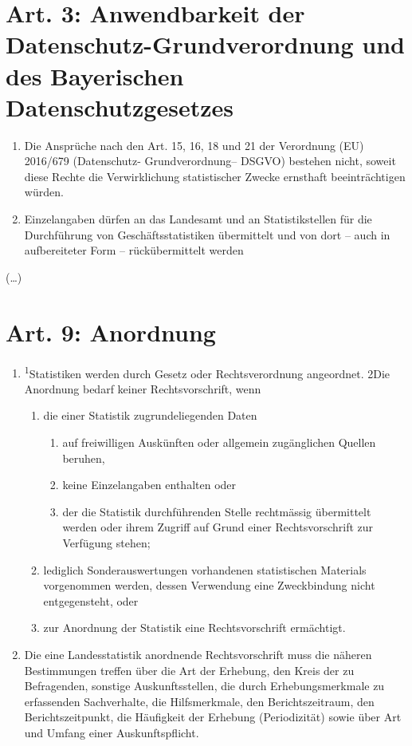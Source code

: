     \section[Art. 3: EU-DSGVO und BayDatSchG]{Art. 3: Anwendbarkeit der Datenschutz-Grundverordnung und des Bayerischen Datenschutzgesetzes}
        \begin{enumerate}[label=(\arabic*)]
            \item Die Ansprüche nach den Art. 15, 16, 18 und 21 der Verordnung (EU) 2016/679 (Datenschutz- Grundverordnung– DSGVO) bestehen nicht, soweit diese Rechte die Verwirklichung statistischer Zwecke ernsthaft beeinträchtigen würden.
            \item Einzelangaben dürfen an das Landesamt und an Statistikstellen für die Durch\-füh\-rung von Geschäftsstatistiken übermittelt und von dort – auch in aufbereiteter Form – rückübermittelt werden
        \end{enumerate}
    (\dots)
    \section{Art. 9: Anordnung}
        \begin{enumerate}[label=(\arabic*)]
            \item \textsuperscript{1}Statistiken werden durch Gesetz oder Rechtsverordnung angeordnet. 2Die Anordnung bedarf keiner Rechtsvorschrift, wenn
            \begin{enumerate}[label=\arabic*.]
                \item die einer Statistik zugrundeliegenden Daten
                    \begin{enumerate}[label=(\alph*)]
                        \item auf freiwilligen Auskünften oder allgemein zugänglichen Quellen beruhen,
                        \item keine Einzelangaben enthalten oder
                        \item der die Statistik durchführenden Stelle rechtmässig übermittelt werden oder ihrem Zugriff auf Grund einer Rechtsvorschrift zur Verfügung stehen;
                    \end{enumerate}
                \item lediglich Sonderauswertungen vorhandenen statistischen Materials vorgenommen werden, dessen Verwendung eine Zweckbindung nicht entgegensteht, oder
                \item zur Anordnung der Statistik eine Rechtsvorschrift ermächtigt.
            \end{enumerate}
            \item Die eine Landesstatistik anordnende Rechtsvorschrift muss die näheren Bestimmungen treffen über die Art der Erhebung, den Kreis der zu Befragenden, sonstige Auskunftsstellen, die durch Erhebungsmerkmale zu erfassenden Sachverhalte, die Hilfsmerkmale, den Berichtszeitraum, den Berichtszeitpunkt, die Häufigkeit der Erhebung (Periodizität) sowie über Art und Umfang einer Auskunftspflicht.
        \end{enumerate}

